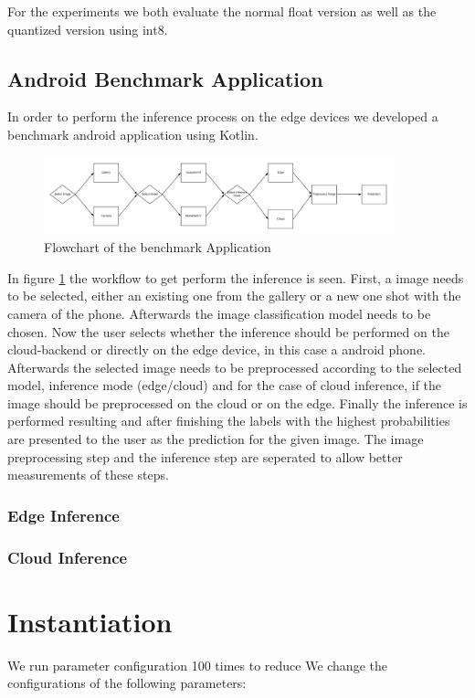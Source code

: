 For the experiments we both evaluate the normal float version as well as the quantized version using int8.
\subsection{Android Benchmark Application}
In order to perform the inference process on the edge devices we developed a benchmark android application using Kotlin. 

\begin{figure}[H]
\centering
\includegraphics[width=0.9\textwidth]{./Bilder/FlowChart_App.png}
\caption{Flowchart of the benchmark Application}
\label{fig:app}
\end{figure}
In figure \ref{fig:app} the workflow to get perform the inference is seen. First, a image needs to be selected, either an existing one from the gallery or a new one shot with the camera of the phone. Afterwards the image classification model needs to be chosen. Now the user selects whether the inference should be performed on the cloud-backend or directly on the edge device, in this case a android phone. Afterwards the selected image needs to be preprocessed according to the selected model, inference mode (edge/cloud) and for the case of cloud inference, if the image should be preprocessed on the cloud or on the edge. Finally the inference is performed resulting and after finishing the labels with the highest probabilities are presented to the user as the prediction for the given image. The image preprocessing step and the inference step are seperated to allow better measurements of these steps.
\subsubsection{Edge Inference}

\subsubsection{Cloud Inference}
\section{Instantiation}
We run parameter configuration 100 times to reduce 
We change the configurations of the following parameters:
